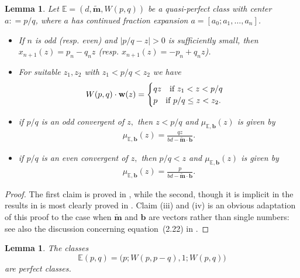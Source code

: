 \documentclass[11pt, reqno]{amsart}
\newtheorem{lemma}[thm]{Lemma}
\theoremstyle{remark}
\numberwithin{equation}{subsection}
\numberwithin{figure}{section}
\theoremstyle{customremark}
\newcommand{\bw}{{\bf w}}
\newcommand{\bE}{{\mathbb E}}
\newcommand{\btm}{\widetilde{\bm{m}}}
\begin{document}
\begin{lemma} \label{lem:convObs}  Let $\bE = (d, \btm, W(p,q))$ be a quasi-perfect class with center $a: = p/q$, where $a$ has continued fraction expansion 
 $a= [a_0;a_1,\hdots,a_n]$.
     \begin{itemize}\item[{\rm(i)}] If $n$ is odd (resp. even) and $|p/q-z|>0$ is sufficiently small, then
 $x_{n+1}(z) = p_n-q_nz$ (resp. $x_{n+1}(z)=-p_n+q_nz$). 

\item[{\rm(ii)}] For suitable $z_1,z_2$ with $z_1< p/q < z_2$ we have
  \begin{align*}
   W(p,q) \cdot \bw(z)=\begin{cases}
qz \quad \text{if $z_1<z<p/q$} \\
  p \quad \text{if $p/q \leq z <z_2$}.\end{cases}
\end{align*}
 \item[{\rm(iii)}] 
  if $p/q$ is an odd convergent of $z,$ then $z<p/q$ and $\mu_{\bE,\bm{b}}(z)$ is given by 
  \begin{align}\label{eq:perfectObs1}
\mu_{\bE,\bm{b}}(z) =    \frac{qz}{bd-\btm \cdot \bm{b}}.
\end{align}
 \item[{\rm(iv)}] 
  if $p/q$ is an even convergent of $z,$ then $p/q<z$ and $\mu_{\bE,\bm{b}}(z)$ is given by 
  \begin{align}\label{eq:perfectObs2}
\mu_{\bE,\bm{b}}(z) =    \frac{p}{bd-\btm \cdot \bm{b}}.
\end{align}
\end{itemize}
\end{lemma}
\begin{proof} The first  claim is proved in \cite[Lem.2.2.1]{ball}, while the second, though it is implicit in the results in \cite[\S2.2]{ball} 
is most clearly proved in \cite[Lemma 16]{BHM}.  Claim (iii) and (iv) 
is an obvious adaptation of this proof 
     to the case when $\btm$ and $\bm{b}$ are vectors rather than single numbers: see also the discussion concerning equation~(2.22) in \cite{AADT}. 
\end{proof}



\begin{lemma}
    The classes \begin{equation} \label{eq:Epq}
        \bE(p,q)=\bigl(p;W(p,p-q),1;W(p,q)\bigr)
    \end{equation} are perfect classes.
    \end{lemma}
    
\end{document}
